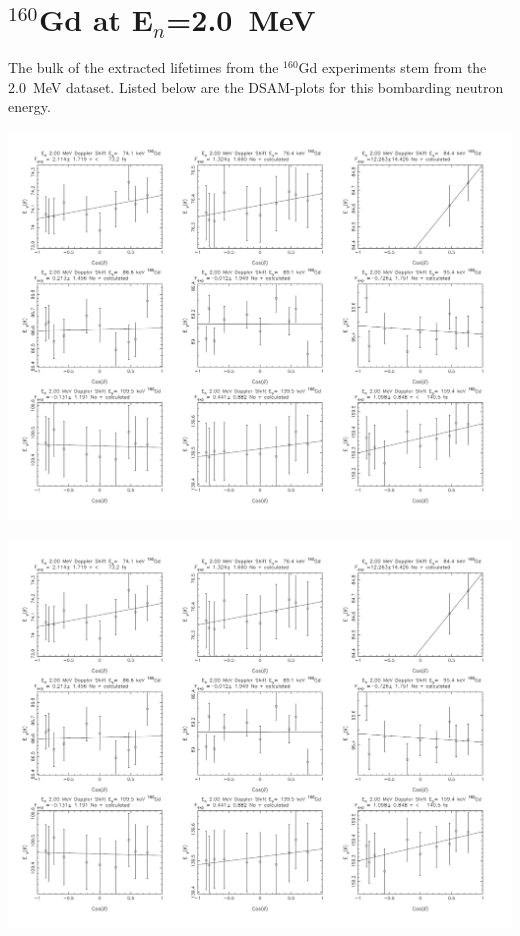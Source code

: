 \section{$^{160}$Gd at E$_n$=2.0~MeV}\label{app:DSAM_Gd_20}
The bulk of the extracted lifetimes from the $^{160}$Gd experiments stem from the 2.0~MeV dataset. Listed below are the DSAM-plots for this bombarding neutron energy.
\begin{center}
\includegraphics[page=1,angle=90,height=0.95\textheight]{160Gd_20_DSAM.pdf}
\end{center}
\begin{center}
\includegraphics[page=2,angle=90,height=0.95\textheight]{160Gd_20_DSAM.pdf}
\end{center}
